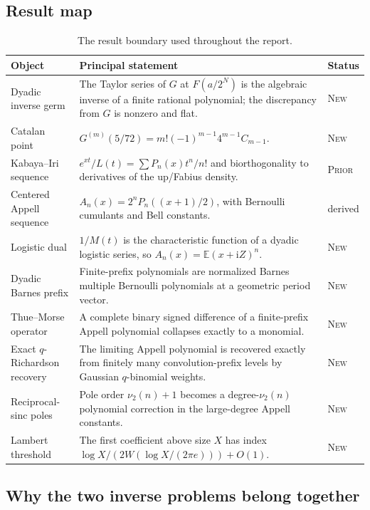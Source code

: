 \documentclass[11pt,oneside]{article}
\theoremstyle{frontier}
\theoremstyle{definition}
\theoremstyle{remark}
\newcommand{\ii}{\mathrm i}
\newcommand{\vtwo}{\nu_2}
\newcommand{\statuslit}{\textsc{Prior}}
\newcommand{\statusnew}{\textsc{New}}
\begin{document}
\subsection{Result map}

\begin{table}[htbp]
\centering
\small
\begin{tabularx}{\textwidth}{@{}p{}X p{}@{}}
\toprule
Object & Principal statement & Status \\
\midrule
Dyadic inverse germ
& The Taylor series of $G$ at $F(a/2^N)$ is the algebraic inverse of a finite rational polynomial;
  the discrepancy from $G$ is nonzero and flat. & \statusnew \\
Catalan point
& $G^{(m)}(5/72)=m!(-1)^{m-1}4^{m-1}C_{m-1}$. & \statusnew \\
Kabaya--Iri sequence
& $e^{xt}/L(t)=\sum P_n(x)t^n/n!$ and biorthogonality to derivatives of the up/Fabius density. & \statuslit \\
Centered Appell sequence
& $A_n(x)=2^nP_n((x+1)/2)$, with Bernoulli cumulants and Bell constants. & derived \\
Logistic dual
& $1/M(t)$ is the characteristic function of a dyadic logistic series, so
  $A_n(x)=\mathbb E(x+\ii Z)^n$. & \statusnew \\
Dyadic Barnes prefix
& Finite-prefix polynomials are normalized Barnes multiple Bernoulli polynomials at a geometric period vector. & \statusnew \\
Thue--Morse operator
& A complete binary signed difference of a finite-prefix Appell polynomial collapses exactly to a monomial. & \statusnew \\
Exact $q$-Richardson recovery
& The limiting Appell polynomial is recovered exactly from finitely many convolution-prefix levels by Gaussian $q$-binomial weights. & \statusnew \\
Reciprocal-sinc poles
& Pole order $\vtwo(n)+1$ becomes a degree-$\vtwo(n)$ polynomial correction in the large-degree Appell constants. & \statusnew \\
Lambert threshold
& The first coefficient above size $X$ has index $\log X/(2W(\log X/(2\pi e)))+O(1)$. & \statusnew \\
\bottomrule
\end{tabularx}
\caption{The result boundary used throughout the report.}
\label{tab:result-map}
\end{table}

\subsection{Why the two inverse problems belong together}
\end{document}
